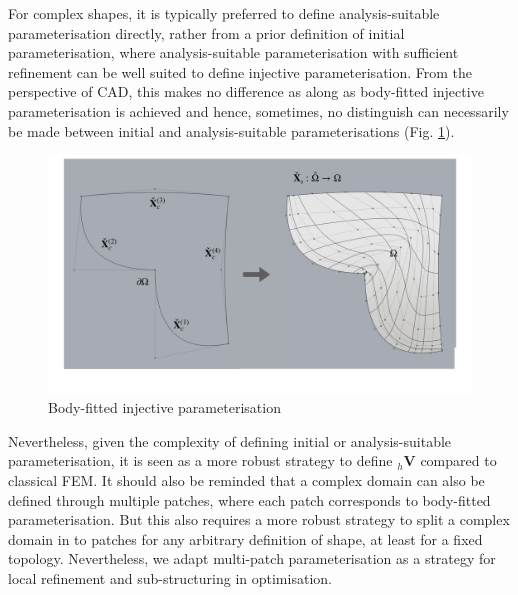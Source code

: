 For complex shapes, it is typically preferred to define analysis-suitable parameterisation directly, rather from a prior definition of initial parameterisation, where analysis-suitable parameterisation with sufficient refinement can be well suited to define injective parameterisation. 
From the perspective of CAD, this makes no difference as along as body-fitted injective parameterisation is achieved and hence, sometimes, no distinguish can necessarily be made between initial and analysis-suitable parameterisations (Fig. \ref{fig:body_pos}). 

 \begin{figure}[h!]
    \centering
    \includegraphics[scale=0.25]{Chapter5/Pictures/body_pos}
    \caption{Body-fitted injective parameterisation}
    \label{fig:body_pos}
\end{figure}

Nevertheless, given the complexity of defining initial or analysis-suitable parameterisation, it is seen as a more robust strategy to define ${}_h \bm V$ compared to classical FEM. 
It should also be reminded that a complex domain can also be defined through multiple patches, where each patch corresponds to body-fitted parameterisation. But this also requires a more robust strategy to split a complex domain in to patches for any arbitrary definition of shape, at least for a fixed topology.
Nevertheless, we adapt multi-patch parameterisation as a strategy for local refinement and sub-structuring in optimisation.\\

